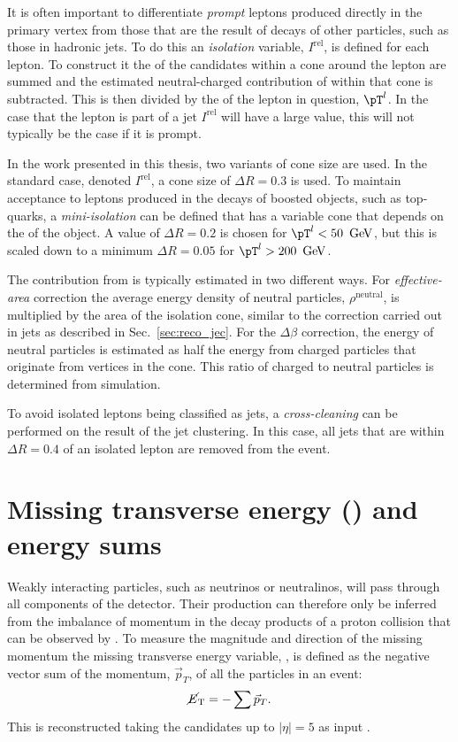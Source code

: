 It is often important to differentiate \emph{prompt} leptons produced
directly in the primary vertex from those that are the result of decays
of other particles, such as those in hadronic jets. To do this an
\emph{isolation} variable, $I^{\textrm{rel}}$, is defined for each
lepton. To construct it the \pT of the \PF candidates within a cone
around the lepton are summed and the estimated neutral-charged
contribution of \PU within that cone is subtracted. This is then
divided by the \pT of the lepton in question, $\pT^l$. In the case
that the lepton is part of a jet $I^{\textrm{rel}}$ will have a large
value, this will not typically be the case if it is prompt.

In the work presented in this thesis, two variants of cone size are
used. In the standard case, denoted $I^{\textrm{rel}}$, a cone size
of $\Delta R=0.3$ is used. To maintain acceptance to leptons produced
in the decays of boosted objects, such as top-quarks, a
\emph{mini-isolation} can be defined that has a variable cone that
depends on the \pT of the object. A value of $\Delta R=0.2$ is chosen
for $\pT^l<50~\gev$, but this is scaled down to a minimum $\Delta
R=0.05$ for $\pT^l>200~\gev$.

The contribution from \PU is typically estimated in two different
ways. For \emph{effective-area} correction the average \PU energy
density of neutral particles, $\rho^{\textrm{neutral}}$, is multiplied
by the area of the isolation cone, similar to the \PU correction
carried out in jets as described in Sec.~\ref{sec:reco_jec}. For the
\emph{$\Delta\beta$} correction, the energy of neutral particles is
estimated as half the energy from charged particles that originate
from \PU vertices in the cone. This ratio of charged to neutral
particles is determined from simulation. %

To avoid isolated leptons being classified as jets, a
\emph{cross-cleaning} can be performed on the result of the jet clustering.
In this case, all jets that are within $\Delta R=0.4$ of an isolated
lepton are removed from the event.

\section{Missing transverse energy (\met) and energy sums}
\label{sec:met_reco}

Weakly interacting particles, such as neutrinos or neutralinos, will
pass through all components of the \CMS detector. Their production can
therefore only be inferred from the imbalance of momentum in the decay
products of a proton collision that can be observed by \CMS. To
measure the magnitude and direction of the missing momentum the
missing transverse energy variable, \met, is defined as the negative
vector sum of the momentum, $\vec{p}_T$, of all the particles in an
event:
\begin{equation}
\mbox{$\cancel{E}_\text{T}$} = -\sum{\vec{p}_T}.
\end{equation}
This is reconstructed taking the \PF candidates up to $|\eta|=5$ as
input \cite{1748-0221-10-02-P02006}. 

